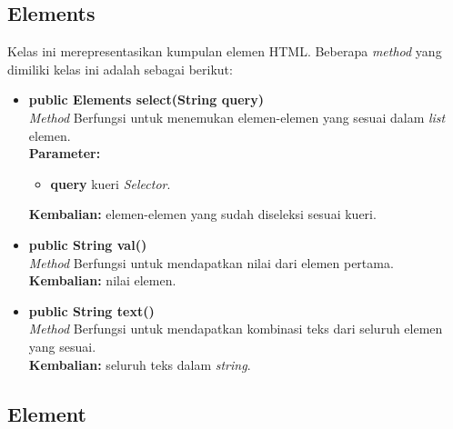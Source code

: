 \subsection{Elements}

Kelas ini merepresentasikan kumpulan elemen HTML. Beberapa \textit{method} yang dimiliki kelas ini adalah sebagai berikut:
\begin{itemize}
	\item \textbf{public Elements select(String query)} \\
		\textit{Method} Berfungsi untuk menemukan elemen-elemen yang sesuai dalam \textit{list} elemen. \\
		\textbf{Parameter:} 
		\begin{itemize}
			\item \textbf{query} kueri \textit{Selector}.
		\end{itemize}
		\textbf{Kembalian:} elemen-elemen yang sudah diseleksi sesuai kueri.	
		
		\item \textbf{public String val()} \\
		\textit{Method} Berfungsi untuk mendapatkan nilai dari elemen pertama. \\
		\textbf{Kembalian:} nilai elemen.	
		
		\item \textbf{public String text()} \\
		\textit{Method} Berfungsi untuk mendapatkan kombinasi teks dari seluruh elemen yang sesuai. \\
		\textbf{Kembalian:} seluruh teks dalam \textit{string}.	
\end{itemize}

\subsection{Element}

